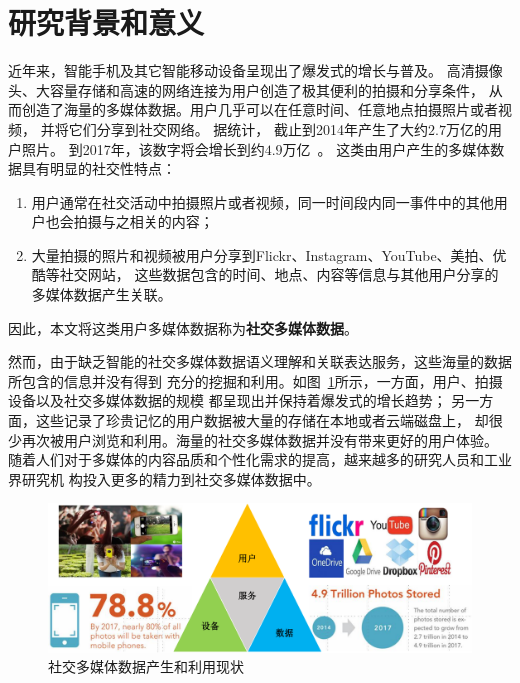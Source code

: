 \documentclass[doctor]{ustcthesis}
\begin{document}
\section{研究背景和意义}
近年来，智能手机及其它智能移动设备呈现出了爆发式的增长与普及。
高清摄像头、大容量存储和高速的网络连接为用户创造了极其便利的拍摄和分享条件，
从而创造了海量的多媒体数据。用户几乎可以在任意时间、任意地点拍摄照片或者视频，
并将它们分享到社交网络。 据统计， 截止到2014年产生了大约$2.7$万亿的用户照片。
到2017年，该数字将会增长到约$4.9$万亿~\cite{phototrend}。
这类由用户产生的多媒体数据具有明显的社交性特点：
\begin{enumerate}\setlength{\itemsep}{0pt}
    \item 用户通常在社交活动中拍摄照片或者视频，同一时间段内同一事件中的其他用户也会拍摄与之相关的内容；
    \item 大量拍摄的照片和视频被用户分享到Flickr、Instagram、YouTube、美拍、优酷等社交网站，
        这些数据包含的时间、地点、内容等信息与其他用户分享的多媒体数据产生关联。
\end{enumerate}
因此，本文将这类用户多媒体数据称为\textbf{社交多媒体数据}。

然而，由于缺乏智能的社交多媒体数据语义理解和关联表达服务，这些海量的数据所包含的信息并没有得到
充分的挖掘和利用。如图~\ref{fig:status}所示，一方面，用户、拍摄设备以及社交多媒体数据的规模
都呈现出并保持着爆发式的增长趋势；
另一方面，这些记录了珍贵记忆的用户数据被大量的存储在本地或者云端磁盘上，
却很少再次被用户浏览和利用。海量的社交多媒体数据并没有带来更好的用户体验。
随着人们对于多媒体的内容品质和个性化需求的提高，越来越多的研究人员和工业界研究机
构投入更多的精力到社交多媒体数据中。

\begin{figure}[ht]
\centering
\includegraphics[width=1\textwidth]{social-media.pdf}
\caption{社交多媒体数据产生和利用现状} \label{fig:status}
\end{figure}
\end{document}

